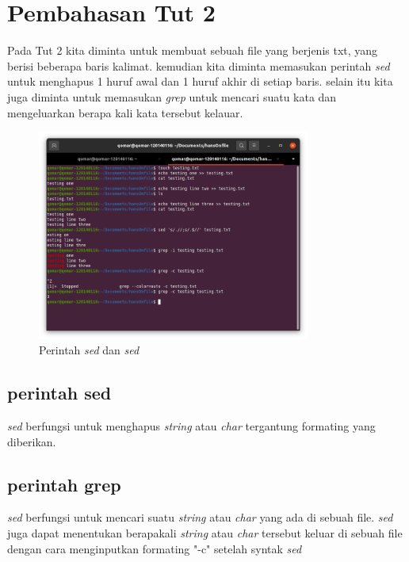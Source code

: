 \documentclass[11pt,a4paper]{article}
\begin{document}
\section{Pembahasan Tut 2}
Pada Tut 2 kita diminta untuk membuat sebuah file yang berjenis txt, yang berisi beberapa baris kalimat. kemudian kita diminta memasukan perintah \textit{sed} untuk menghapus 1 huruf awal dan 1 huruf akhir di setiap baris. selain itu kita juga diminta untuk memasukan \textit{grep} untuk mencari suatu kata dan mengeluarkan berapa kali kata tersebut kelauar.
	\begin{figure}[h]
		\centering
		\includegraphics[width=0.8\textwidth]{figure/tut2.png}
		\caption{Perintah \textit{sed} dan \textit{sed}}
	\end{figure}
\subsection*{perintah sed}
	\textit{sed} berfungsi untuk menghapus \textit{string} atau \textit{char} tergantung formating yang diberikan.
	
\subsection*{perintah grep}
	\textit{sed} berfungsi untuk mencari suatu \textit{string} atau \textit{char} yang ada di sebuah file. \textit{sed} juga dapat menentukan berapakali \textit{string} atau \textit{char} tersebut keluar di sebuah file dengan cara menginputkan formating "-c" setelah syntak \textit{sed} 

\newpage
\end{document}
